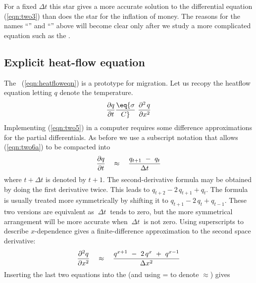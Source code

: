 \par\noindent
For a fixed  $\Delta t$  this star gives
a more accurate solution to the differential
equation (\ref{eqn:two3}) than does the star for the inflation of money.
The reasons for the names ``'' and ``''
above will become clear only after we study a more complicated
equation such as the .
\subsection{Explicit heat-flow equation}
\par
The ~(\ref{eqn:heatfloweqn})
is a prototype for migration. Let us recopy
the heatflow equation letting $q$ denote the temperature.
\begin{equation}
{ \partial q   \over  \partial t } \eq
{ \sigma   \over  C }\  { \partial^{2\,} q   \over  \partial x^2 }
\label{eqn:two5}
\end{equation}
Implementing (\ref{eqn:two5})
in a computer requires some difference approximations
for the partial differentials.
As before we use a subscript notation 
that allows (\ref{eqn:two6a}) to be compacted into
\begin{equation}
{ \partial q   \over  \partial t } \ \ \  \approx \ \ \  { q_{{t+1}}\ -\ q_t  
\over  \Delta t }
\label{eqn:two6b}
\end{equation}
where $t+ \Delta t$ is denoted by  $t+1$.
The second-derivative formula may be obtained by doing the first
derivative twice.
This leads to  $ q_{{t+2}} - 2\,q_{{t+1}} + q_t $.
The formula is usually treated more symmetrically by shifting
it to  $ q_{{t+1}} - 2\,q_t + q_{{t-1}} $.
These two versions
are equivalent as $ \  \Delta t \  $ tends to zero, but the more symmetrical
arrangement will be more accurate when $ \  \Delta t \  $ is not zero.
Using superscripts to describe $x$-dependence gives a finite-difference
approximation to the second space derivative:
\begin{equation}
{ \partial^2 q   \over  \partial x^2 } \ \ \  \approx \ \ \  { q^{{x+1}} 
\ -\ 2\, q^x \ +\ q^{ x-1 }   \over  \Delta x^2 } 
\label{eqn:two7}
\end{equation}
Inserting the last two equations into the 
(and using = to denote $ \approx $) gives

